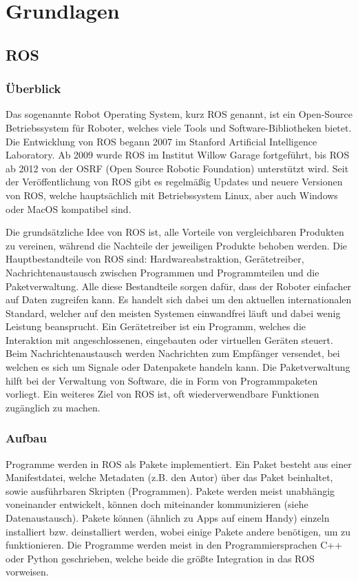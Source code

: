 
\section{Grundlagen}
{
	\subsection{ROS}
	{
		\subsubsection{Überblick}
		{
			Das sogenannte Robot Operating System, kurz ROS genannt, ist ein Open-Source Betriebssystem für Roboter, welches viele Tools und Software-Bibliotheken bietet. Die Entwicklung von ROS begann 2007 im Stanford Artificial Intelligence Laboratory. Ab 2009 wurde ROS im Institut Willow Garage fortgeführt, bis ROS ab 2012 von der OSRF (Open Source Robotic Foundation) unterstützt wird. Seit der Veröffentlichung von ROS gibt es regelmäßig Updates und neuere Versionen von ROS, welche hauptsächlich mit Betriebssystem Linux, aber auch Windows oder MacOS kompatibel sind. 
			
			Die grundsätzliche Idee von ROS ist, alle Vorteile von vergleichbaren Produkten zu vereinen, während die Nachteile der jeweiligen Produkte behoben werden. Die Hauptbestandteile von ROS sind: Hardwareabstraktion, Gerätetreiber, Nachrichtenaustausch zwischen Programmen und Programmteilen und die Paketverwaltung. Alle diese Bestandteile sorgen dafür, dass der Roboter einfacher auf Daten zugreifen kann. Es handelt sich dabei um den aktuellen internationalen Standard, welcher auf den meisten Systemen einwandfrei läuft und dabei wenig Leistung beansprucht. Ein Gerätetreiber ist ein Programm, welches die Interaktion mit angeschlossenen, eingebauten oder virtuellen Geräten steuert. Beim Nachrichtenaustausch werden Nachrichten zum Empfänger versendet, bei welchen es sich um Signale oder Datenpakete handeln kann. Die Paketverwaltung hilft bei der Verwaltung von Software, die in Form von Programmpaketen vorliegt. Ein weiteres Ziel von ROS ist, oft wiederverwendbare Funktionen zugänglich zu machen. 
			
		}
		
		\subsubsection{Aufbau}
		{ Programme werden in ROS als Pakete implementiert. Ein Paket besteht aus einer Manifestdatei, welche Metadaten (z.B. den Autor) über das Paket beinhaltet, sowie ausführbaren Skripten (Programmen). Pakete werden meist unabhängig voneinander entwickelt, können doch miteinander kommunizieren (siehe Datenaustausch). Pakete können (ähnlich zu Apps auf einem Handy) einzeln installiert bzw. deinstalliert werden, wobei einige Pakete andere benötigen, um zu funktionieren. Die Programme werden meist in den Programmiersprachen C++ oder Python geschrieben, welche beide die größte Integration in das ROS vorweisen.
			
}}}
